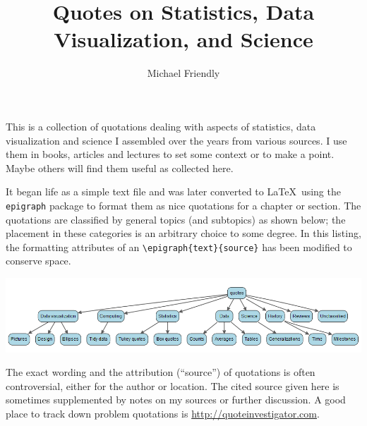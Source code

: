 \documentclass[11pt]{article}
\title{Quotes on Statistics, Data Visualization, and Science}
\author{Michael Friendly}
\begin{document}
\maketitle

This is a collection of quotations dealing with aspects of statistics, data visualization
and science I assembled over the years from various
sources.  I use them in books, articles and lectures to set some context
or to make a point. Maybe others will find them useful as collected here.
 
It began life as a simple text file and was later converted to
\LaTeX\  using the \texttt{epigraph} package to format them as nice
quotations for a chapter or section.  
The quotations are classified by general topics (and subtopics) as shown below; the placement
in these categories is an arbitrary choice to some degree.
In this listing, the formatting attributes of an \verb|\epigraph{text}{source}|
has been modified to conserve space.

\begin{centering}
\includegraphics[width=\textwidth]{qtree}
\end{centering}

The exact wording and the attribution (``source'') of quotations is often controversial, either for
the author or location.
The cited source given here is sometimes
supplemented by notes on my sources or further discussion.
A good place to track down problem quotations is \url{http://quoteinvestigator.com}.





\end{document}
